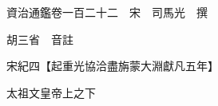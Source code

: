 










 


 
 


 

  
  
  
  
  





  
  
  
  
  
 
  

  

  
  
  



  

 
 

  
   




  

  
  


  　　資治通鑑卷一百二十二　宋　司馬光　撰

　　胡三省　音註

　　宋紀四【起重光協洽盡旃蒙大淵獻凡五年】

　　太祖文皇帝上之下

